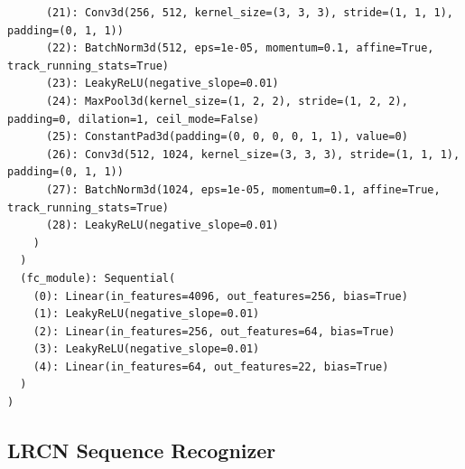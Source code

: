 \documentclass[10pt,twocolumn,letterpaper]{article}
\begin{document}
{\begin{verbatim}
      (21): Conv3d(256, 512, kernel_size=(3, 3, 3), stride=(1, 1, 1), padding=(0, 1, 1))
      (22): BatchNorm3d(512, eps=1e-05, momentum=0.1, affine=True, track_running_stats=True)
      (23): LeakyReLU(negative_slope=0.01)
      (24): MaxPool3d(kernel_size=(1, 2, 2), stride=(1, 2, 2), padding=0, dilation=1, ceil_mode=False)
      (25): ConstantPad3d(padding=(0, 0, 0, 0, 1, 1), value=0)
      (26): Conv3d(512, 1024, kernel_size=(3, 3, 3), stride=(1, 1, 1), padding=(0, 1, 1))
      (27): BatchNorm3d(1024, eps=1e-05, momentum=0.1, affine=True, track_running_stats=True)
      (28): LeakyReLU(negative_slope=0.01)
    )
  )
  (fc_module): Sequential(
    (0): Linear(in_features=4096, out_features=256, bias=True)
    (1): LeakyReLU(negative_slope=0.01)
    (2): Linear(in_features=256, out_features=64, bias=True)
    (3): LeakyReLU(negative_slope=0.01)
    (4): Linear(in_features=64, out_features=22, bias=True)
  )
)
\end{verbatim}
}

\subsection{LRCN Sequence Recognizer}
\end{document}
